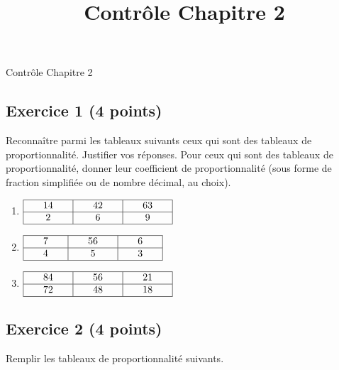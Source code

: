 \documentclass[14 pt]{extarticle}
\title{Contrôle Chapitre 2}
\date{}
\theoremstyle{plain}
\begin{document}
\begin{center}{\Large Contrôle Chapitre 2}\\ 
 \end{center}
 
 
 \subsection*{Exercice 1 (4 points)}

 Reconnaître parmi les tableaux suivants ceux qui sont des tableaux de proportionnalité. Justifier vos réponses. Pour ceux qui sont des tableaux de proportionnalité, donner leur coefficient de proportionnalité (sous forme de fraction simplifiée ou de nombre décimal, au choix). 
 \begin{enumerate}
 \item $\renewcommand{\arraystretch}{1}
\begin{array}{|c|c|c|}
\hline
\phantom{000}14\phantom{000} & \phantom{000}42\phantom{000} & \phantom{000}63\phantom{000}\\
\hline
2 & 6 & 9\\
\hline
\end{array}
\renewcommand{\arraystretch}{1}$
 \item $\renewcommand{\arraystretch}{1}
\begin{array}{|c|c|c|}
\hline
\phantom{000}7\phantom{000} & \phantom{000}56 \phantom{000} & \phantom{000}6\phantom{000}\\
\hline
4 & 5 & 3\\
\hline
\end{array}
\renewcommand{\arraystretch}{1}$

\item $\renewcommand{\arraystretch}{1}
\begin{array}{|c|c|c|}
\hline
\phantom{000}84\phantom{000} & \phantom{000}56\phantom{000} & \phantom{000}21 \phantom{000}\\
\hline
72 & 48  & 18\\
\hline
\end{array}
\renewcommand{\arraystretch}{1}$

\end{enumerate}

\subsection*{Exercice 2 (4 points)}

Remplir les tableaux de proportionnalité suivants. 
\end{document}
